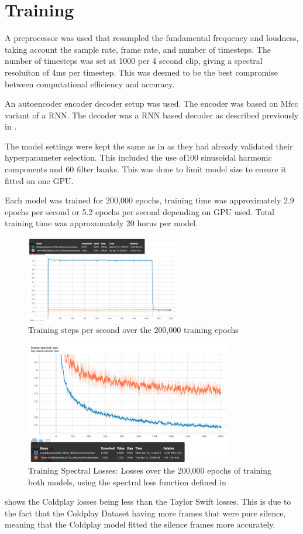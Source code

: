 \section{Training}

A preprocessor was used that resampled the fundamental frequency and loudness, taking account the sample rate, frame rate, and number of timesteps. The number of timesteps was set at 1000 per 4 second clip, giving a spectral resoluiton of 4ms per timestep. This was deemed to be the best compromise between computational efficiency and accuracy.

An autoencoder encoder decoder setup was used. The encoder was based on Mfcc variant of a \acrfull{RNN}. The decoder was a RNN based decoder as described previously in .

The model settings were kept the same as in  as they had already validated their hyperparameter selection. This included the use of100 sinusoidal harmonic components and 60 filter banks. This was done to limit model size to ensure it fitted on one GPU.

Each model was trained for 200,000 epochs, training time was approximately 2.9 epochs per second or 5.2 epochs per second depending on GPU used. Total training time was approxumately 20 horus per model.

\begin{figure}
    \centering
    \includegraphics[width=0.6\textwidth]{research/training/StepsPerSecond.png}
    \caption{Training steps per second over the 200,000 training epochs}
\end{figure}

\begin{figure}
    \centering
    \includegraphics[width=0.8\textwidth]{research/training/TrainingSpectralLosses.png}
    \caption{Training Spectral Losses: Losses over the 200,000 epochs of training both models, using the spectral loss function defined in }
    \label{fig:training_spectral_losses}
\end{figure}

 shows the Coldplay losses being less than the Taylor Swift losses. This is due to the fact that the Coldplay Dataset having more frames that were pure silence, meaning that the Coldplay model fitted the silence frames more accurately.

